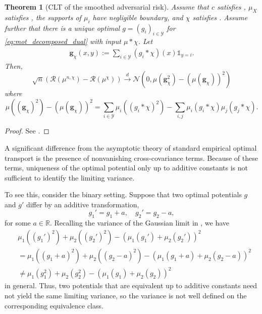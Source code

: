 \documentclass{amsart}
\theoremstyle{plain}
\numberwithin{equation}{section}\newtheorem{theorem}{Theorem}[section]
\theoremstyle{remark}
\begin{document}
\begin{theorem}[CLT of the smoothed adversarial risk]\label{thm: smooth limit}
Assume that $c$ satisfies , $\mu_X$ satisfies , the supports of $\mu_i$ have negligible boundary, and $\chi$ satisfies . Assume further that there is a unique optimal $g=(g_i)_{i \in \mathcal{Y}}$ for \eqref{eq:mot_decomposed_dual} with input $\mu * \chi$. Let
\begin{align}
\label{eq:gchi}
\bm{g}_\chi(x,y) := \sum_{i \in \mathcal{Y}}  (g_i * \chi) (x) \mathds{1}_{y=i}.
\end{align}
Then, 
\[
    \sqrt{n} (\mathscr{R}(\mu^{n,\chi})- \mathscr{R}(\mu^\chi) ) \overset{d}{\longrightarrow} \mathcal{N} \left( 0,  \mu( \bm{g}_\chi^2) - \left( \mu(\bm{g}_\chi) \right)^2 \right)
\]
where 
\[
    \mu( (\bm{g}_\chi)^2) - \left( \mu(\bm{g}_\chi) \right)^2 = \sum_{i \in \mathcal{Y}} \mu_i \left( (g_i * \chi)^2 \right) - \sum_{i,  j} \mu_i(g_i * \chi)\mu_j(g_j * \chi).
\]
\end{theorem}

\begin{proof}
See .    
\end{proof}



A significant difference from the asymptotic theory of standard empirical optimal transport is the presence of nonvanishing cross-covariance terms. Because of these terms, uniqueness of the optimal potential only up to additive constants is not sufficient to identify the limiting variance.

To see this, consider the binary setting. Suppose that two optimal potentials \(g\) and \(g'\) differ by an additive transformation,
\[
    g_1'=g_1+a, \quad g_2'=g_2-a,
\]
for some $a\in\mathbb{R}$. Recalling the variance of the Gaussian limit in , we have
\begin{align*}
    &\mu_1( (g_1')^2) + \mu_2( (g_2')^2) - (\mu_1 (g_1') + \mu_2(g_2') )^2\\
    &=\mu_1( (g_1+ a)^2) + \mu_2( (g_2 - a)^2) - (\mu_1 (g_1 + a) + \mu_2(g_2 -a) )^2\\
    &\neq \mu_1( g_1^2) + \mu_2( g_2^2) - (\mu_1 (g_1) + \mu_2(g_2) )^2
\end{align*}
in general. Thus, two potentials that are equivalent up to additive constants need not yield the same limiting variance, so the variance is not well defined on the corresponding equivalence class.
\end{document}
